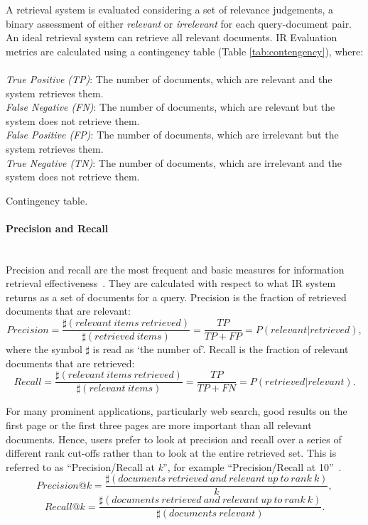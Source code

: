 A retrieval system is evaluated considering a set of relevance judgements, a binary assessment of either \textit{relevant} or \textit{irrelevant} for each query-document pair. An ideal retrieval system can retrieve all relevant documents. IR Evaluation metrics are calculated using a contingency table (Table \ref{tab:contengency}), where:\\\\
\textit{True Positive (TP)}: The number of documents, which are relevant and the system retrieves them.\\
\textit{False Negative (FN)}: The number of documents, which are relevant but the system does not retrieve them. \\
\textit{False Positive (FP)}: The number of documents, which are irrelevant but the system retrieves them.\\
\textit{True Negative (TN)}: The number of documents, which are irrelevant and the system does not retrieve them. 
\begin{table*}[t!]
  \centering
  
  \caption{Contingency table.}
  \label{tab:contengency}
\end{table*}
\FloatBarrier 
\paragraph{Precision and Recall}
\ \\
Precision and recall are the most frequent and basic measures for information retrieval effectiveness~\citep{manning2008introduction}. They are calculated with respect to what IR system returns as a set of documents for a query.
Precision is the fraction of retrieved documents that are relevant:
\[
Precision=\frac{\sharp(relevant \: items \: retrieved)}{\sharp(retrieved \: items)}=\frac{TP}{TP+FP}=P(relevant|retrieved),
\]
where the symbol $\sharp$ is read as `the number of'.
Recall is the fraction of relevant documents that are retrieved:
\[
Recall=\frac{\sharp(relevant \: items \: retrieved)}{\sharp(relevant \: items)}=\frac{TP}{TP+FN}=P(retrieved|relevant).
\]

For many prominent applications, particularly web search, good results on the first page or the first three pages are more important than all relevant documents. Hence, users prefer to look at precision and recall over a series of different rank cut-offs rather than to look at the entire retrieved set. This is referred to as ``Precision/Recall at \textit{k}'', for example ``Precision/Recall at 10''~\citep{manning2008introduction}. 
\begin{equation}
Precision@k=\frac{\sharp(documents \: retrieved \: and \: relevant \: up \: to \: rank \: k)}{k},
\end{equation}
\begin{equation}
Recall@k=\frac{\sharp(documents \: retrieved \: and \: relevant \: up \: to \: rank \: k)}{\sharp(documents \: relevant)}.
\end{equation}
